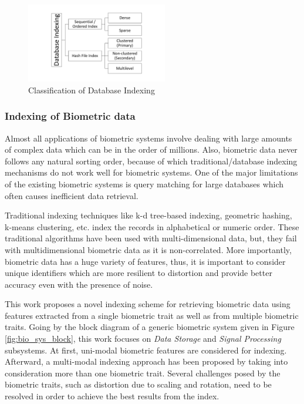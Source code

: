 \begin{figure}
    \centering
    \includegraphics[width=0.55\textwidth]{images/Classification of database indexing.pdf}
    \caption{Classification of Database Indexing \cite{garcia2008database}}
    \label{fig:index_class}
\end{figure}

\subsubsection{Indexing of Biometric data}
Almost all applications of biometric systems involve dealing with large amounts of complex data which can be in the order of millions. 
Also, biometric data never follows any natural sorting order, because of which traditional/database indexing mechanisms do not work well for biometric systems. 
One of the major limitations of the existing biometric systems is query matching for large databases which often causes inefficient data retrieval. 

Traditional indexing techniques like k-d tree-based indexing, geometric hashing, k-means clustering, etc. index the records in alphabetical or numeric
order. These traditional algorithms have been used with multi-dimensional
data, but, they fail with multidimensional biometric data as it is non-correlated. More importantly, biometric data has a huge variety of features, thus, it is important to
consider unique identifiers which are more resilient to distortion and provide better
accuracy even with the presence of noise.

This work proposes a novel indexing scheme for retrieving biometric data using features extracted from a single biometric trait as well as from multiple biometric traits. Going by the block diagram of a generic biometric system given in Figure \ref{fig:bio_sys_block}, this work focuses on \textit{Data Storage} and \textit{Signal Processing} subsystems. At first, uni-modal biometric features are considered for indexing. Afterward, a multi-modal indexing approach has been proposed by taking into consideration more than one biometric trait. Several challenges
posed by the biometric traits, such as distortion due to scaling and rotation, need to be resolved in order to achieve the best results from the index. 

